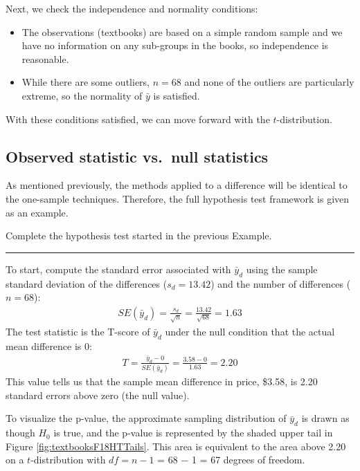 \documentclass[
  10pt,
  openany]{book}
\theoremstyle{definition}
\theoremstyle{definition}
\theoremstyle{definition}
\theoremstyle{definition}
\theoremstyle{remark}
\begin{document}
Next, we check the independence and normality conditions:

\begin{itemize}
\item
  The observations (textbooks) are based on a simple random sample and we have no information on any sub-groups in the books,
  so independence is reasonable.
\item
  While there are some outliers,
  \(n = 68\) and none of the outliers
  are particularly extreme, so the normality
  of \(\bar{y}\) is satisfied.
\end{itemize}

With these conditions satisfied,
we can move forward with the \(t\)-distribution.

\subsection{Observed statistic vs.~null statistics}\label{observed-statistic-vs.-null-statistics-2}

As mentioned previously, the methods applied to a difference will be identical to the one-sample techniques. Therefore, the full hypothesis test framework is given as an example.

Complete the hypothesis test started
in the previous Example.

\begin{center}\rule{0.5\linewidth}{0.5pt}\end{center}

To start, compute the standard error associated with
\(\bar{y}_{d}\) using the sample standard
deviation of the differences
(\(s_{d} = 13.42\))
and the number of differences
(\(n = 68\)):
\begin{align*}
  SE(\bar{y}_{d})
    = \frac{s_{d}}{\sqrt{n}}
    = \frac{13.42}{\sqrt{68}} = 1.63
  \end{align*}
The test statistic is the T-score of
\(\bar{y}_{d}\)
under the null condition that the actual mean
difference is 0:
\begin{align*}
  T
    = \frac{\bar{y}_{d} - 0}
        { SE(\bar{y}_{d})}
    = \frac{3.58 - 0}{1.63} = 2.20
  \end{align*}
This value tells us that the sample mean difference in price, \$3.58,
is 2.20 standard errors above zero (the null value).

To visualize the p-value, the approximate sampling distribution
of \(\bar{y}_{d}\) is drawn as though
\(H_0\) is true,
and the p-value is represented by the shaded upper tail in Figure \ref{fig:textbooksF18HTTails}. This area is equivalent
to the area above 2.20 on a \(t\)-distribution with \(df = n - 1\) = 68 \(-\) 1 = 67 degrees of freedom.
\end{document}
